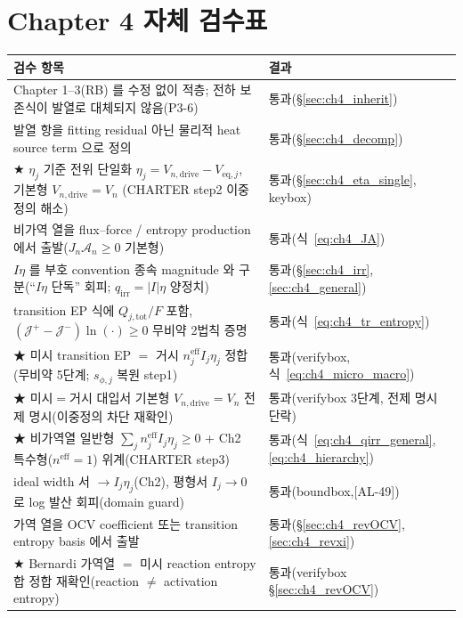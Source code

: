 \documentclass[11pt,a4paper]{article}
\newcommand{\eff}{\mathrm{eff}}
\newcommand{\eq}{\mathrm{eq}}
\newcommand{\drive}{\mathrm{drive}}
\newcommand{\tot}{\mathrm{tot}}
\newcommand{\irr}{\mathrm{irr}}
\newcommand{\AL}[1]{\textsf{[AL-#1]}}
\begin{document}
\section{Chapter 4 자체 검수표}\label{sec:ch4_selfcheck}
{\small
\begin{longtable}{>{\raggedright\arraybackslash}p{} >{\raggedright\arraybackslash}p{}}
\toprule 검수 항목 & 결과 \\ \midrule \endhead
Chapter 1--3(RB) 를 수정 없이 적층; 전하 보존식이 발열로 대체되지 않음(P3-6) & 통과(\S\ref{sec:ch4_inherit}) \\
발열 항을 fitting residual 아닌 물리적 heat source term 으로 정의 & 통과(\S\ref{sec:ch4_decomp}) \\
★ $\eta_j$ 기준 전위 단일화 $\eta_j{=}V_{n,\drive}{-}V_{\eq,j}$, 기본형 $V_{n,\drive}{=}V_n$ (CHARTER step2 이중정의 해소) & 통과(\S\ref{sec:ch4_eta_single}, keybox) \\
비가역 열을 flux--force / entropy production 에서 출발($J_n\mathcal A_n\ge0$ 기본형) & 통과(식~\eqref{eq:ch4_JA}) \\
$I\eta$ 를 부호 convention 종속 magnitude 와 구분(``$I\eta$ 단독'' 회피; $q_\irr{=}|I|\eta$ 양정치) & 통과(\S\ref{sec:ch4_irr},\ref{sec:ch4_general}) \\
transition EP 식에 $Q_{j,\tot}/F$ 포함, $(\mathcal J^+{-}\mathcal J^-)\ln(\cdot)\ge0$ 무비약 2법칙 증명 & 통과(식~\eqref{eq:ch4_tr_entropy}) \\
★ 미시 transition EP $=$ 거시 $n_j^{\eff}I_j\eta_j$ 정합(무비약 5단계; $s_{\phi,j}$ 복원 step1) & 통과(verifybox,식~\eqref{eq:ch4_micro_macro}) \\
★ 미시$=$거시 대입서 기본형 $V_{n,\drive}{=}V_n$ 전제 명시(이중정의 차단 재확인) & 통과(verifybox 3단계, 전제 명시 단락) \\
★ 비가역열 일반형 $\sum_j n_j^{\eff}I_j\eta_j\ge0$ + Ch2 특수형($n^\eff{=}1$) 위계(CHARTER step3) & 통과(식~\eqref{eq:ch4_qirr_general},\eqref{eq:ch4_hierarchy}) \\
ideal width 서 $\to I_j\eta_j$(Ch2), 평형서 $I_j{\to}0$ 로 log 발산 회피(domain guard) & 통과(boundbox,\AL{49}) \\
가역 열을 OCV coefficient 또는 transition entropy basis 에서 출발 & 통과(\S\ref{sec:ch4_revOCV},\ref{sec:ch4_revxi}) \\
★ Bernardi 가역열 $=$ 미시 reaction entropy 합 정합 재확인(reaction $\ne$ activation entropy) & 통과(verifybox \S\ref{sec:ch4_revOCV}) \\

\end{longtable}}
\end{document}
